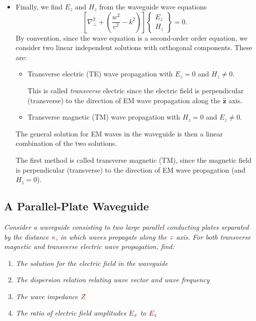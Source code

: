 \documentclass[11pt, a4paper]{article}
\newcommand{\dmath}[1]{\textcolor{Maroon}{#1}}  %
\renewcommand{\vec}[1]{\bm{#1}} %
\newcommand{\uvec}[1]{\hat{\vec{#1}}} %
\renewcommand{\laplacian}{\nabla^{2}}
\begin{document}
\begin{itemize}
	\item Finally, we find $ E_{z} $ and $ H_{z} $ from the waveguide wave equations
	\begin{equation*}
		\left[\laplacian_{\perp} + \left(\frac{w^{2}}{c^{2}} - k^{2}\right)\right]
		\begin{Bmatrix}
		E_{z}\\
		H_{z}
		\end{Bmatrix}
		= 0.
	\end{equation*}
	By convention, since the wave equation is a second-order order equation, we consider two linear independent solutions with orthogonal components. These are:
	\begin{itemize}
		\item Transverse electric (TE) wave propagation with $ E_{z} = 0 $ and $ H_{z} \neq 0 $. 
		
		This is called \textit{transverse} electric since the electric field is perpendicular (transverse) to the direction of EM wave propagation along the $ \uvec{z} $ axis.
		
		\item Transverse magnetic (TM) wave propagation with $ H_{z} = 0 $ and $ E_{z} \neq 0 $.
	\end{itemize}
	The general solution for EM waves in the waveguide is then a linear combination of the two solutions.
	
	
	
	The first method is called transverse magnetic (TM), since the magnetic field is perpendicular (transverse) to the direction of EM wave propagation (and $ H_{z} = 0 $). 
	
	
\end{itemize}

\subsection{A Parallel-Plate Waveguide}
\textit{Consider a waveguide consisting to two large parallel conducting plates separated by the distance $ \dmath{a} $, in which waves propagate along the $ \dmath{z} $ axis. For both transverse magnetic and transverse electric wave propagation, find:}
\begin{enumerate}
	\item \textit{The solution for the electric field in the waveguide}
	\item \textit{The dispersion relation relating wave vector and wave frequency}
    \item \textit{The wave impedance $ \dmath{Z} $}
    \item \textit{The ratio of electric field amplitudes $ \dmath{E_{x}} $ to $ \dmath{E_{z}} $}
\end{enumerate}
\end{document}
